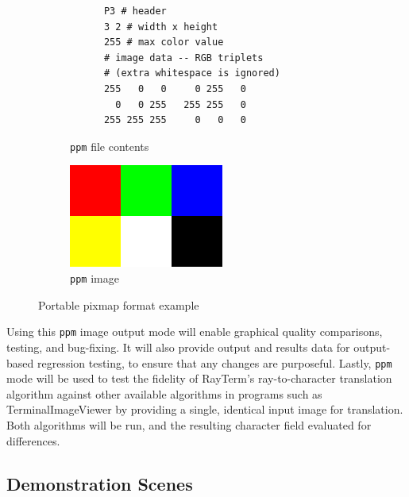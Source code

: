 \documentclass[11pt]{article}
\newcommand{\name}{{\sc RayTerm}}
\begin{document}
\begin{figure}[htb]
  \begin{subfigure}[htb]{0.5\textwidth}
    \small
    \vspace{2.6em}
    \begin{verbatim}
      P3 # header
      3 2 # width x height
      255 # max color value
      # image data -- RGB triplets
      # (extra whitespace is ignored)
      255   0   0     0 255   0
        0   0 255   255 255   0
      255 255 255     0   0   0
    \end{verbatim}
    \caption{\texttt{ppm} file contents}
    \label{fig:ppm_code}
  \end{subfigure}
  \begin{subfigure}[htb]{0.5\textwidth}
    \includegraphics[width=\textwidth]{resources/ppm_example}
    \caption{\texttt{ppm} image}
    \label{fig:ppm_image}
  \end{subfigure}
  \caption{Portable pixmap format example}
\end{figure}

Using this \texttt{ppm} image output mode will enable graphical quality comparisons, testing, and bug-fixing.
It will also provide output and results data for output-based regression testing, to ensure that any changes are purposeful.
Lastly, \texttt{ppm} mode will be used to test the fidelity of \name's ray-to-character translation algorithm against other available algorithms in programs such as TerminalImageViewer by providing a single, identical input image for translation.
Both algorithms will be run, and the resulting character field evaluated for differences.


\subsection{Demonstration Scenes}
\label{sec:evaluate:demo_scenes}
\end{document}
